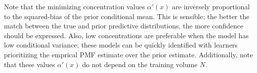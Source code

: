 \documentclass[12pt]{report}
\DeclareMathOperator{\xrm}{\mathrm{x}}
\DeclareMathOperator{\yrm}{\mathrm{y}}
\DeclareMathOperator{\nrm}{\mathrm{n}}
\DeclareMathOperator{\Erm}{\mathrm{E}}
\begin{document}
Note that the minimizing concentration values $\alpha'(x)$ are inversely proportional to the squared-bias of the prior conditional mean. This is sensible; the better the match between the true and prior predictive distributions, the more confidence should be expressed. Also, low concentrations are preferable when the model has low conditional variance; these models can be quickly identified with learners prioritizing the emprical PMF estimate over the prior estimate. Additionally, note that these values $\alpha'(x)$ do not depend on the training volume $N$.



\end{document}
